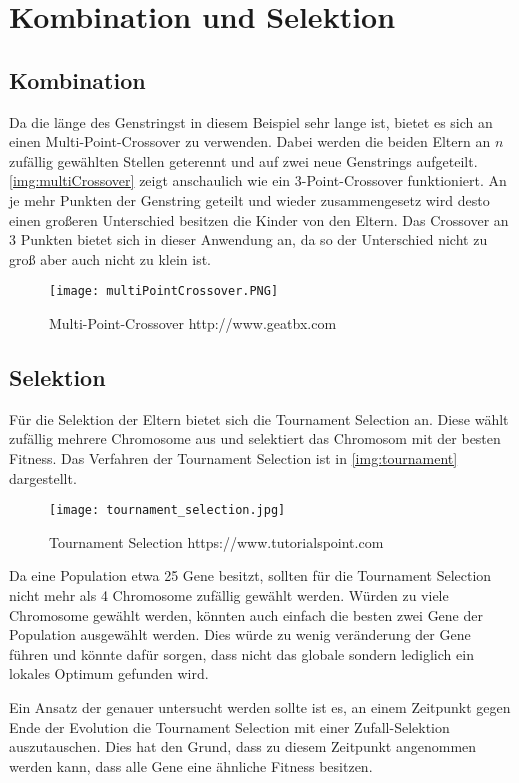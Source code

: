 \section{Kombination und Selektion}\label{sec:eltern}
\subsection{Kombination}
Da die länge des Genstringst in diesem Beispiel sehr lange ist, bietet es sich an einen Multi-Point-Crossover zu verwenden.
Dabei werden die beiden Eltern an $n$ zufällig gewählten Stellen geterennt und auf zwei neue Genstrings aufgeteilt.
\autoref{img:multiCrossover} zeigt anschaulich wie ein 3-Point-Crossover funktioniert. An je mehr Punkten
der Genstring geteilt und wieder zusammengesetz wird desto einen großeren Unterschied besitzen die Kinder von
den Eltern. Das Crossover an 3 Punkten bietet sich in dieser Anwendung an, da so der Unterschied nicht zu groß aber auch nicht zu klein ist.

\begin{figure}[h]
    \begin{minipage}{\textwidth}
	    \centering
        \texttt{[image: multiPointCrossover.PNG]}
	    \caption{Multi-Point-Crossover {http://www.geatbx.com}}
        \label{img:multiCrossover}
    \end{minipage}
\end{figure}

\subsection{Selektion}
Für die Selektion der Eltern bietet sich die Tournament Selection an.
Diese wählt zufällig mehrere Chromosome aus und selektiert das Chromosom mit der besten Fitness. Das Verfahren der
Tournament Selection ist in \autoref{img:tournament} dargestellt.


\begin{figure}
    \begin{minipage}{\textwidth}
        \texttt{[image: tournament\_selection.jpg]}
        \caption{Tournament Selection {https://www.tutorialspoint.com}}
        \label{img:tournament}
    \end{minipage}
\end{figure}

Da eine Population etwa 25 Gene besitzt, sollten für die Tournament Selection nicht mehr als 4 Chromosome zufällig gewählt werden.
Würden zu viele Chromosome gewählt werden, könnten auch einfach die besten zwei Gene der Population ausgewählt werden.
Dies würde zu wenig veränderung der Gene führen und könnte dafür sorgen, dass nicht das globale sondern
lediglich ein lokales Optimum gefunden wird.

Ein Ansatz der genauer untersucht werden sollte ist es, an einem Zeitpunkt gegen Ende der
Evolution die Tournament Selection mit einer Zufall-Selektion auszutauschen.
Dies hat den Grund, dass zu diesem Zeitpunkt angenommen werden kann, dass alle
Gene eine ähnliche Fitness besitzen.